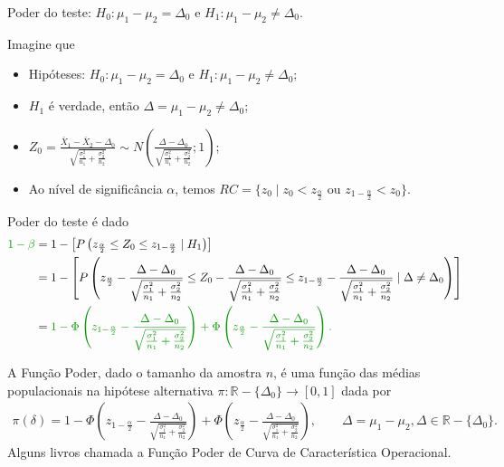 \documentclass[9pt]{beamer}
\begin{document}
\begin{frame}{Poder do teste: $H_0:\mu_1 - \mu_2 = \Delta_0$ e $H_1: \mu_1 - \mu_2 \neq \Delta_0$.}

\tiny

Imagine que
\begin{itemize}
	\item Hipóteses: $H_0: \mu_1 - \mu_2 = \Delta_0$ e $H_1: \mu_1 -  \mu_2 \neq \Delta_0$;
	\item $H_1$ é verdade, então $\Delta = \mu_1-\mu_2 \neq \Delta_0$;
	\item $Z_0 = \frac{\bar{X}_1 - \bar{X}_2 - \Delta_0}{ \sqrt{ \frac{\sigma_1^2}{n_1} + \frac{\sigma_2^2}{n_2} } } \sim N\left( \frac{\Delta - \Delta_0}{ \sqrt{ \frac{\sigma_1^2}{n_1} + \frac{\sigma_2^2}{n_2} } } ; 1\right)$;
	\item Ao nível de significância $\alpha$, temos $RC = \{ z_0 \mid z_0 < z_{\frac{\alpha}{2}} \mbox{ ou } z_{1-\frac{\alpha}{2}} < z_0  \}$.
\end{itemize}
\vfill	

Poder do teste é dado
\begin{align*}
\textcolor{important}{1-\beta} &=1 - \left[P\left( z_\frac{\alpha}{2} \leq Z_0 \leq z_{1 - \frac{\alpha}{2}} \mid H_1 \right)\right]\\
& = 1- \left[ P \left( z_\frac{\alpha}{2} - \frac{\Delta - \Delta_0}{ \sqrt{ \frac{\sigma_1^2}{n_1} + \frac{\sigma_2^2}{n_2} } } \leq Z_0 - \frac{\Delta - \Delta_0}{ \sqrt{ \frac{\sigma_1^2}{n_1} + \frac{\sigma_2^2}{n_2} } } \leq z_{1 - \frac{\alpha}{2}} - \frac{\Delta - \Delta_0}{ \sqrt{ \frac{\sigma_1^2}{n_1} + \frac{\sigma_2^2}{n_2} } } \mid \Delta \neq \Delta_0 \right)\right]\\
&= \textcolor{important}{1 - \Phi\left( z_{1-\frac{\alpha}{2}} - \frac{\Delta - \Delta_0}{ \sqrt{ \frac{\sigma_1^2}{n_1} + \frac{\sigma_2^2}{n_2} } } \right) + \Phi\left( z_{\frac{\alpha}{2}} - \frac{\Delta - \Delta_0}{ \sqrt{ \frac{\sigma_1^2}{n_1} + \frac{\sigma_2^2}{n_2} } } \right).}
\end{align*}
\vfill

A \textcolor{important}{Função Poder}, dado o tamanho da amostra $n$, é uma função das médias populacionais na hipótese alternativa  $\pi: \mathbb{R} - \{\Delta_0\} \longrightarrow [0,1]$ dada por
\begin{align*}
\pi(\delta) = 1 - \Phi\left( z_{1-\frac{\alpha}{2}} - \frac{\Delta - \Delta_0}{ \sqrt{ \frac{\sigma_1^2}{n_1} + \frac{\sigma_2^2}{n_2} } } \right) + \Phi\left( z_{\frac{\alpha}{2}} - \frac{\Delta - \Delta_0}{ \sqrt{ \frac{\sigma_1^2}{n_1} + \frac{\sigma_2^2}{n_2} } } \right), \qquad \Delta = \mu_1 - \mu_2, \Delta \in \mathbb{R} - \{\Delta_0 \}.
\end{align*}
Alguns livros chamada a Função Poder de \textcolor{important}{Curva de Característica Operacional.}

\normalsize

\end{frame}
\end{document}
